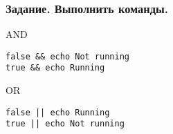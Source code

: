 \begin{frame}[fragile]
    \frametitle{ Задание. Выполнить команды.}
\begin{block}{AND}
	\small\begin{lstlisting}
false && echo Not running
true && echo Running
	\end{lstlisting}
\end{block}

\begin{block}{OR}
	\small\begin{lstlisting}
false || echo Running
true || echo Not running
	\end{lstlisting}
\end{block}
\end{frame}
